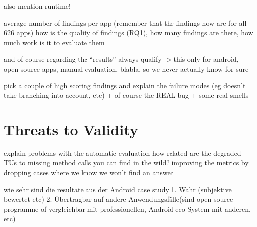 also mention runtime!

average number of findings per app (remember that the findings now are for all 626 apps)
how is the quality of findings (RQ1), how many findings are there, how much work is it to evaluate them

and of course regarding the ``results'' always qualify -> this only for android, open source apps, manual evaluation, blabla, so we never actually know for sure

pick a couple of high scoring findings and explain the failure modes (eg doesn't take branching into account, etc)
+ of course the REAL bug + some real smells


\section{Threats to Validity}

explain problems with the automatic evaluation
how related are the degraded TUs to missing method calls you can find in the wild?
improving the metrics by dropping cases where we know we won't find an answer

wie sehr sind die resultate aus der Android case study 1. Wahr (subjektive bewertet etc) 2. Übertragbar auf andere Anwendungsfälle(sind open-source programme of vergleichbar mit professionellen, Android eco System mit anderen, etc)
